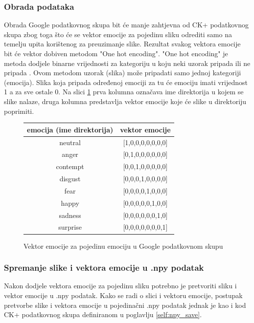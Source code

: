 \documentclass[times, utf8, zavrsni,numeric,pstricks]{fer}
\begin{document}
\subsubsection{Obrada podataka}
Obrada Google podatkovnog skupa bit će manje zahtjevna od CK+ podatkovnog skupa zbog toga što će se vektor emocije za pojedinu sliku odrediti samo na temelju upita korištenog za preuzimanje slike. Rezultat svakog vektora emocije bit će vektor dobiven metodom "One hot encoding". "One hot encoding" je metoda dodjele binarne vrijednosti za kategoriju u koju neki uzorak pripada ili ne pripada \cite{one_hot_encoding}. Ovom metodom uzorak (slika) može pripadati samo jednoj kategoriji (emocija). Slika koja pripada određenoj emociji za tu će emociju imati vrijednost 1 a za sve ostale 0. Na slici \ref{pic:google_emotion_emo_vector} prva kolumna označava ime direktorija u kojem se slike nalaze, druga kolumna predstavlja vektor emocije koje će slike u direktoriju poprimiti.

\begin{figure}[H]
\centering
\begin{tabular}{|c|c|} 
\hline
emocija (ime direktorija) & vektor emocije \\
\hline
neutral & [1,0,0,0,0,0,0,0] \\
anger	& [0,1,0,0,0,0,0,0] \\
contempt & [0,0,1,0,0,0,0,0] \\
disgust & [0,0,0,1,0,0,0,0]\\
fear  & [0,0,0,0,1,0,0,0]\\
happy & [0,0,0,0,0,1,0,0]\\
sadness & [0,0,0,0,0,0,1,0]\\
surprise & [0,0,0,0,0,0,0,1]\\
\hline
\end{tabular}
\caption{Vektor emocije za pojedinu emociju u Google podatkovnom skupu}
\label{pic:google_emotion_emo_vector}
\end{figure}

\subsubsection{Spremanje slike i vektora emocije u .npy podatak}
Nakon dodjele vektora emocije za pojedinu sliku potrebno je pretvoriti sliku i vektor emocije u .npy podatak. Kako se radi o slici i vektoru emocije, postupak pretvorbe slike i vektora emocije u pojedinačni .npy podatak jednak je kao i kod CK+ podatkovnog skupa definiranom u poglavlju \ref{self:npy_save}.
\end{document}
